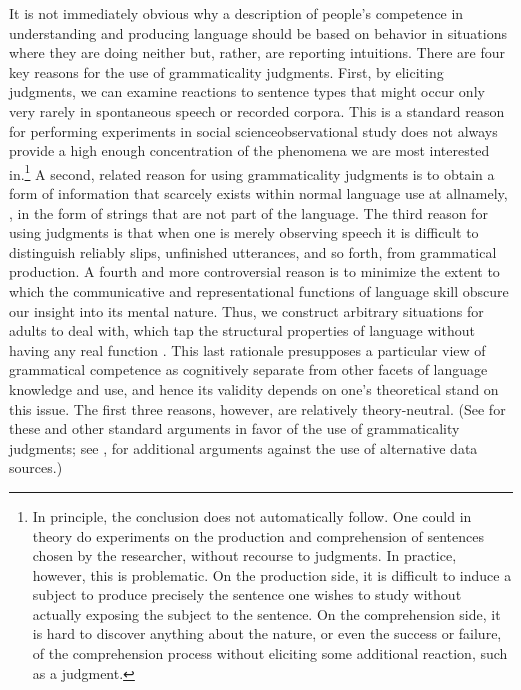 It is not immediately obvious why a description of people's competence in understanding and producing language should be based on behavior in situations where they are doing neither but, rather, are reporting intuitions. There are four key reasons for the use of grammaticality judgments. First, by eliciting judgments, we can examine reactions to sentence types that might occur only very rarely in spontaneous speech or recorded corpora. This is a standard reason for performing experiments in social science\schdash{}observational study does not always provide a high enough concentration of the phenomena we are most interested in.\footnote{In principle, the conclusion does not automatically follow. One could in theory do experiments on the production and comprehension of sentences chosen by the researcher, without recourse to judgments. In practice, however, this is problematic. On the production side, it is difficult to induce a subject to produce precisely the sentence one wishes to study without actually exposing the subject to the sentence. On the comprehension side, it is hard to discover anything about the nature, or even the success or failure, of the comprehension process without eliciting some additional reaction, such as a judgment.}
 A second, related reason for using grammaticality judgments is to obtain a form of information that  scarcely exists within normal language use at all\schdash{}namely, , in the form of strings that are not part of the language. The third reason for using judgments is that when one is merely observing speech it is difficult to distinguish reliably slips, unfinished utterances, and so forth, from grammatical production. A fourth and more controversial reason is to minimize the extent to which the communicative and representational functions of language skill  obscure our insight into its mental nature. Thus, we construct arbitrary situations for adults to deal with, which tap the structural properties of language without having any real function \citep{Bever1986}. This last rationale presupposes a particular view of grammatical competence as cognitively separate from other facets of language knowledge and use, and hence its validity depends on one's theoretical stand on this issue. The first three reasons, however, are relatively theory-neutral. (See \citet{Grandy1981} for these and other standard arguments in favor of the use of grammaticality judgments; see \citet[62\textendash{}63]{Newmeyer1983}, for additional arguments against the use of alternative data sources.)

